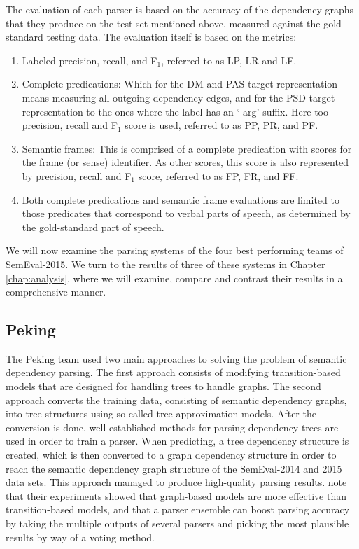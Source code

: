 The evaluation of each parser is based on the accuracy of the dependency graphs that they produce on the test set mentioned above, measured against the gold-standard testing data. The evaluation itself is based on the metrics: 

\begin{enumerate}
    \item Labeled precision, recall, and F$_1$, referred to as LP, LR and LF.
    \item Complete predications: Which for the DM and PAS target representation means measuring all outgoing dependency edges, and for the PSD target representation to the ones where the label has an `-arg' suffix. Here too precision, recall and F$_1$ score is used, referred to as PP, PR, and PF.
    \item Semantic frames: This is comprised of a complete predication with scores for the frame (or sense) identifier. As other scores, this score is also represented by precision, recall and F$_1$ score, referred to as FP, FR, and FF.
    \item Both complete predications and semantic frame evaluations are limited to those predicates that correspond to verbal parts of speech, as determined by the gold-standard part of speech.
\end{enumerate}

We will now examine the parsing systems of the four best performing teams of SemEval-2015. We turn to the results of three of these systems in Chapter \ref{chap:analysis}, where we will examine, compare and contrast their results in a comprehensive manner.

\subsection{Peking} 

The Peking team used two main approaches to solving the problem of semantic dependency parsing. The first approach consists of modifying transition-based models that are designed for handling trees to handle graphs. The second approach converts the training data, consisting of semantic dependency graphs, into tree structures using so-called tree approximation models. After the conversion is done, well-established methods for parsing dependency trees are used in order to train a parser. When predicting, a tree dependency structure is created, which is then converted to a graph dependency structure in order to reach the semantic dependency graph structure of the SemEval-2014 and 2015 data sets. This approach managed to produce high-quality parsing results.  note that their experiments showed that graph-based models are more effective than transition-based models, and that a parser ensemble can boost parsing accuracy by taking the multiple outputs of several parsers and picking the most plausible results by way of a voting method.

